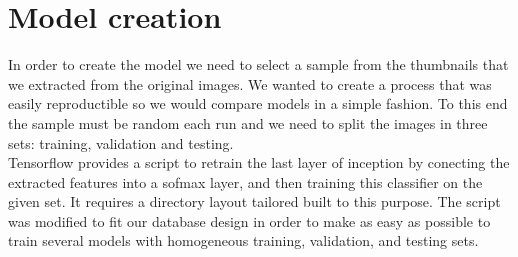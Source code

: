 \section{Model creation}

In order to create the model we need to select a sample from the thumbnails that we extracted from the original images. We wanted to create a process that was easily reproductible so we would compare models in a simple fashion. To this end the sample must be random each run and we need to split the images in three sets: training, validation and testing.\\

Tensorflow provides a script to retrain the last layer of inception by conecting the extracted features into a sofmax layer, and then training this classifier on the given set. It requires a directory layout tailored built to this purpose. The script was modified to fit our database design in order to make as easy as possible to train several models with homogeneous training, validation, and testing sets.


